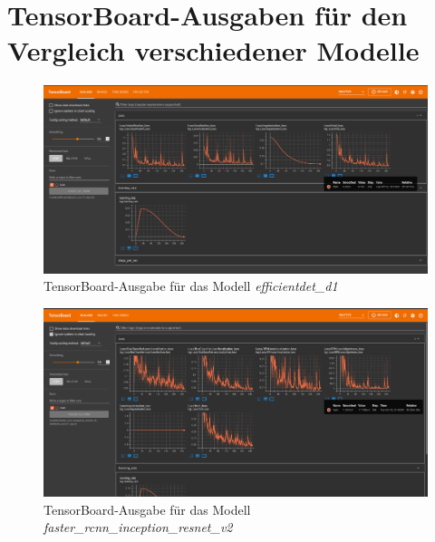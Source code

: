     
    
    
    
    
    
    \pagebreak
    
    \section{TensorBoard-Ausgaben für den Vergleich verschiedener Modelle}
    \label{app: TensorBoard-Ausgaben für den Vergleich verschiedener Modelle}
    
    \begin{figure}[H]
        \vspace{-0.027\textheight}
        \centering
        \includegraphics[angle = 90, height = 0.92\textheight]{Bilder/models/model_comparison/tensorboards/efficientdet_d1_coco17_tpu-32.png}
        \caption{TensorBoard-Ausgabe für das Modell \textit{efficientdet\_d1}}
        \label{fig:TensorBoard-1}
    \end{figure}
    
    \begin{figure}[H]
        \centering
        \includegraphics[angle = 90, height = 0.92\textheight]{Bilder/models/model_comparison/tensorboards/faster_rcnn_inception_resnet_v2_640x640_coco17_tpu-8.png}
        \caption{TensorBoard-Ausgabe für das Modell \textit{faster\_rcnn\_inception\_resnet\_v2}}
        \label{fig:TensorBoard-2}
    \end{figure}
    
